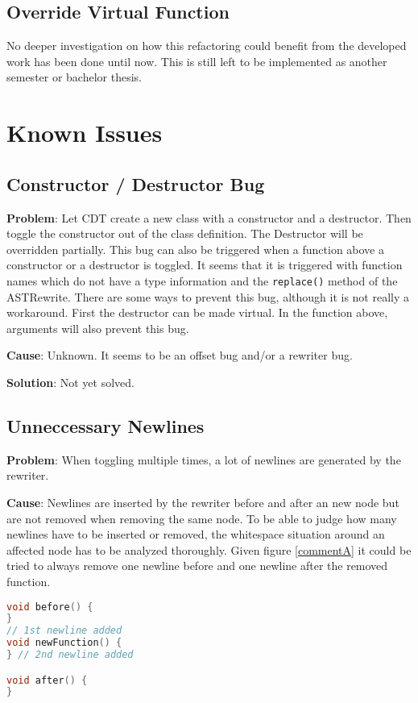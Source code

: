 \subsection{Override Virtual Function}
No deeper investigation on how this refactoring could benefit from the developed 
work has been done until now. This is still left to be implemented as another
semester or bachelor thesis.

\section{Known Issues}

\subsection{Constructor / Destructor Bug}\label{ctorBug}
\textbf{Problem}: Let CDT create a new class with a constructor and a destructor. 
Then toggle the constructor out of the class definition. The Destructor will be 
overridden partially. This bug can also be triggered when a function above a
constructor or a destructor is toggled. It seems that it is triggered with
function names which do not have a type information and the \texttt{replace()}
method of the ASTRewrite.
There are some ways to prevent this bug, although it is not really a workaround.
First the destructor can be made virtual. In the function above, arguments will
also prevent this bug.

\textbf{Cause}: Unknown. It seems to be an offset bug and/or a rewriter bug.

\textbf{Solution}: Not yet solved.

\label{newlines}
\subsection{Unneccessary Newlines}
\textbf{Problem}: When toggling multiple times, a lot of newlines are generated 
by the rewriter. 

\textbf{Cause}: Newlines are inserted by the rewriter before and after an new
node but are not removed when removing the same node. To be able to judge how 
many newlines have to be inserted or removed, the whitespace situation around an 
affected node has to be analyzed thoroughly. Given figure \ref{commentA} it 
could be tried to always remove one newline before and one newline after the 
removed function.

\begin{lstlisting}[caption={Whitespaces will not be removed blindly},
label={commentA}, language=C++]
void before() {
}
// 1st newline added
void newFunction() {
} // 2nd newline added

void after() {
}
\end{lstlisting}

